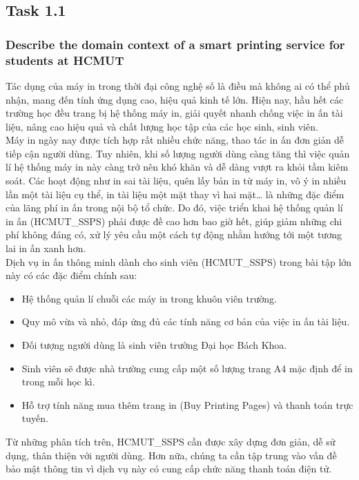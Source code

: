 \subsection{Task 1.1}
    \subsubsection{Describe the domain context of a smart printing service for students at HCMUT}
    Tác dụng của máy in trong thời đại công nghệ số là điều mà không ai có thể phủ nhận, mang đến tính ứng dụng cao, hiệu quả kinh tế lớn. Hiện nay, hầu hết các trường học đều trang bị hệ thống máy in, giải quyết nhanh chống việc in ấn tài liệu, nâng cao hiệu quả và chất lượng học tập của các học sinh, sinh viên.\\
    
    Máy in ngày nay được tích hợp rất nhiều chức năng, thao tác in ấn đơn giản dễ tiếp cận người dùng. Tuy nhiên, khi số lượng người dùng càng tăng thì việc quản lí hệ thống máy in này càng trở nên khó khăn và dễ dàng vượt ra khỏi tầm kiêm soát. Các hoạt động như in sai tài liệu, quên lấy bản in từ máy in, vô ý in nhiều lần một tài liệu cụ thể, in tài liệu một mặt thay vì hai mặt… là những đặc điểm của lãng phí in ấn trong nội bộ tổ chức. Do đó, việc triển khai hệ thống quản lí in ấn (HCMUT\_SSPS) phải được đề cao hơn bao giờ hết, giúp giảm những chi phí không đáng có, xử lý yêu cầu một cách tự động nhằm hướng tới một tương lai in ấn xanh hơn.\\

    Dịch vụ in ấn thông minh dành cho sinh viên (HCMUT\_SSPS) trong bài tập lớn này có các đặc điểm chính sau:
    \begin{itemize}
    \item Hệ thống quản lí chuỗi các máy in trong khuôn viên trường.
    \item Quy mô vừa và nhỏ, đáp ứng đủ các tính năng cơ bản của việc in ấn tài liệu.
    \item Đối tượng người dùng là sinh viên trường Đại học Bách Khoa.
    \item Sinh viên sẽ được nhà trường cung cấp một số lượng trang A4 mặc định để in trong mỗi học kì.
    \item Hỗ trợ tính năng mua thêm trang in (Buy Printing Pages) và thanh toán trực tuyến.
    \end{itemize}

    Từ những phân tích trên, HCMUT\_SSPS cần được xây dựng đơn giản, dễ sử dụng, thân thiện với người dùng. Hơn nữa, chúng ta cần tập trung vào vấn đề bảo mật thông tin vì dịch vụ này có cung cấp chức năng thanh toán điện tử.
